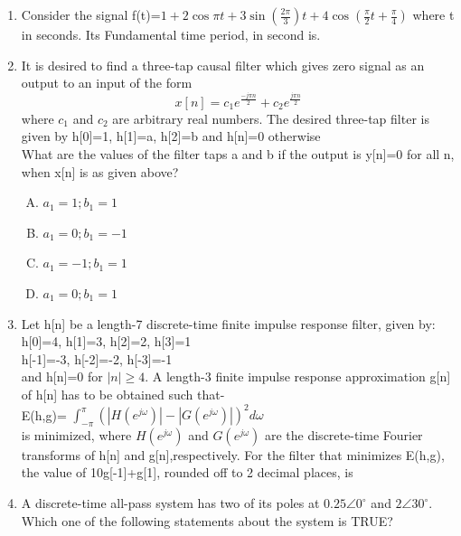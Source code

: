 \documentclass[journal,12pt,twocolumn]{IEEEtran}
\begin{document}
\begin{enumerate}
\item Consider the signal f(t)=$1+2\cos{\pi t}+ 3\sin{(\frac{2\pi}{3})t} +4\cos{(\frac{\pi}{2}t+\frac{\pi}{4})}$ where t in seconds. Its Fundamental time period, in second is. \underline{\hspace{2cm}}


\item It is desired to find a three-tap causal filter which gives zero signal as an output to an input of the form
\begin{equation}
    x[n]=c_1e^{\frac{-j\pi n}{2}}+c_2e^{\frac{j\pi n}{2}}
\end{equation}
where $c_1$ and $c_2$ are arbitrary real numbers. The desired three-tap filter is given by
h[0]=1, h[1]=a, h[2]=b and h[n]=0 otherwise\\
What are the values of the filter taps a and b if the output is y[n]=0 for all n, when x[n] is as given above?

\begin{enumerate}[(A)]

\setlength\itemsep{0.5em}

\item $ a_1=1; b_1=1$
\item $ a_1=0; b_1=-1$

\item $ a_1=-1; b_1=1$

\item $ a_1=0; b_1=1$

\end{enumerate}

\item Let h[n] be  a length-7 discrete-time finite impulse response filter, given by: \\h[0]=4, h[1]=3, h[2]=2, h[3]=1\\
h[-1]=-3, h[-2]=-2,  h[-3]=-1\\
and h[n]=0 for $|n| \geq 4 $. A length-3 finite impulse response approximation g[n] of h[n] has to be obtained such that- \\
E(h,g)= ${\int_{-\pi}^{\pi}{(|H(e^{j\omega})|-|G(e^{j\omega})|)^2}d\omega }$ \\
is minimized, where $H(e^{j\omega})$ and $G(e^{j\omega})$  are the discrete-time Fourier transforms of h[n] and g[n],respectively. For the filter that minimizes E(h,g),  the value of 10g[-1]+g[1], rounded off to 2 decimal places, is \underline{\hspace{2cm}}


\item A discrete-time all-pass system has two of its poles at $0.25\angle 0^\circ$ and $2\angle 30^\circ $. Which one of the
following statements about the system is TRUE?
\begin{enumerate}[(A)]


\end{enumerate}
\end{enumerate}
\end{document}

